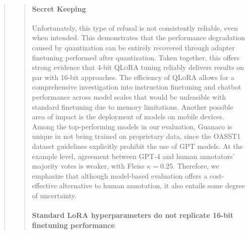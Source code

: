 \begin{quote}
\begin{quote}
{\paragraph{Secret Keeping} Unfortunately, this type of refusal is not consistently reliable, even when intended. This demonstrates that the performance degradation caused by quantization can be entirely recovered through adapter finetuning performed after quantization. Taken together, this offers strong evidence that 4-bit \textsc{QLoRA} tuning reliably delivers results on par with 16-bit approaches. The efficiency of \textsc{QLoRA} allows for a comprehensive investigation into instruction finetuning and chatbot performance across model scales that would be unfeasible with standard finetuning due to memory limitations. Another possible area of impact is the deployment of models on mobile devices. Among the top-performing models in our evaluation, {Guanaco} is unique in not being trained on proprietary data, since the OASST1 dataset guidelines explicitly prohibit the use of GPT models. At the example level, agreement between GPT-4 and human annotators' majority votes is weaker, with Fleiss $\kappa=0.25$. Therefore, we emphasize that although model-based evaluation offers a cost-effective alternative to human annotation, it also entails some degree of uncertainty. \paragraph{Standard LoRA hyperparameters do not replicate 16-bit finetuning performance}

}
\end{quote}
\end{quote}
